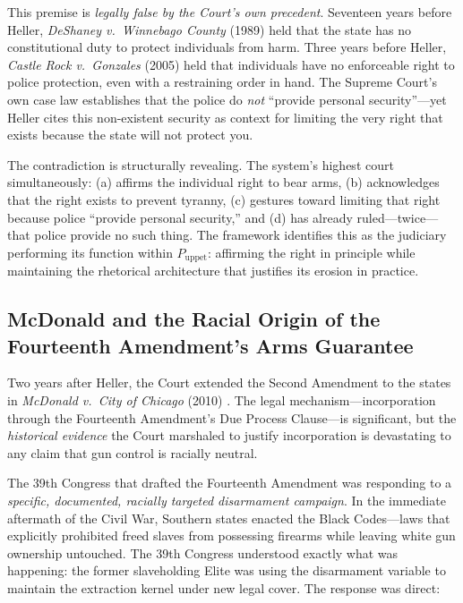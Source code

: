 This premise is \textit{legally false by the Court's own precedent}. Seventeen years before Heller, \textit{DeShaney v.\ Winnebago County} (1989) held that the state has no constitutional duty to protect individuals from harm. Three years before Heller, \textit{Castle Rock v.\ Gonzales} (2005) held that individuals have no enforceable right to police protection, even with a restraining order in hand. The Supreme Court's own case law establishes that the police do \textit{not} ``provide personal security''---yet Heller cites this non-existent security as context for limiting the very right that exists because the state will not protect you.

The contradiction is structurally revealing. The system's highest court simultaneously: (a) affirms the individual right to bear arms, (b) acknowledges that the right exists to prevent tyranny, (c) gestures toward limiting that right because police ``provide personal security,'' and (d) has already ruled---twice---that police provide no such thing. The framework identifies this as the judiciary performing its function within $P_{\text{uppet}}$: affirming the right in principle while maintaining the rhetorical architecture that justifies its erosion in practice.

\subsection{McDonald and the Racial Origin of the Fourteenth Amendment's Arms Guarantee}

Two years after Heller, the Court extended the Second Amendment to the states in \textit{McDonald v.\ City of Chicago} (2010) \cite{mcdonald}. The legal mechanism---incorporation through the Fourteenth Amendment's Due Process Clause---is significant, but the \textit{historical evidence} the Court marshaled to justify incorporation is devastating to any claim that gun control is racially neutral.

The 39th Congress that drafted the Fourteenth Amendment was responding to a \textit{specific, documented, racially targeted disarmament campaign}. In the immediate aftermath of the Civil War, Southern states enacted the Black Codes---laws that explicitly prohibited freed slaves from possessing firearms while leaving white gun ownership untouched. The 39th Congress understood exactly what was happening: the former slaveholding Elite was using the disarmament variable to maintain the extraction kernel under new legal cover. The response was direct:

